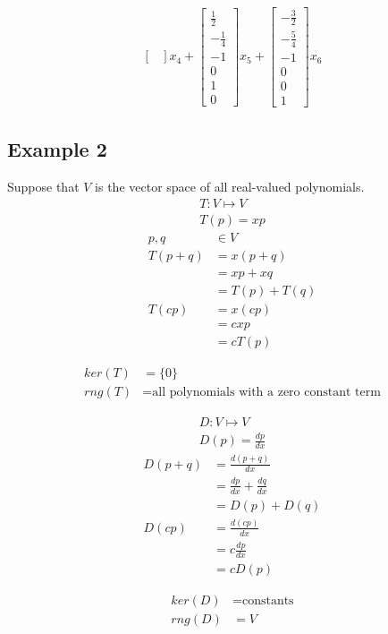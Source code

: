 \documentclass{article}
\theoremstyle{mytheoremstyle}
\theoremstyle{mytheoremstyle}
\theoremstyle{myproblemstyle}
\begin{document}
\begin{align*}
\begin{bmatrix}
        \end{bmatrix} x_4
        + \begin{bmatrix}
            \frac{1}{2} \\
            -\frac{1}{4} \\
            -1 \\
            0 \\
            1 \\
            0
        \end{bmatrix} x_5
        + \begin{bmatrix}
            -\frac{3}{2} \\
            -\frac{5}{4} \\
            -1 \\
            0 \\
            0 \\
            1
        \end{bmatrix} x_6
    \end{align*}

    \subsection*{Example 2}
    Suppose that $V$ is the vector space of all real-valued polynomials.
    \begin{align*}
        T: V \mapsto V \\
        T(p) = xp
    \end{align*}
    \begin{align*}
        p,q&\in V \\
        T(p+q) &= x(p+q) \\
        &= xp + xq \\
        &= T(p) + T(q) \\
        T(cp) &= x(cp) \\
        &= cxp \\
        &= cT(p)
    \end{align*}

    \begin{align*}
        ker(T) &= \{0\} \\
        rng(T) &= \text{all polynomials with a zero constant term}
    \end{align*}

    \begin{align*}
        D: V \mapsto V \\
        D(p) = \frac{dp}{dx}
    \end{align*}
    \begin{align*}
        D(p+q) &= \frac{d(p+q)}{dx} \\
        &= \frac{dp}{dx} + \frac{dq}{dx} \\
        &= D(p) + D(q) \\
        D(cp) &= \frac{d(cp)}{dx} \\
        &= c\frac{dp}{dx} \\
        &= cD(p)
    \end{align*}

    \begin{align*}
        ker(D) &= \text{constants} \\
        rng(D) &= V
    \end{align*}
\end{document}
